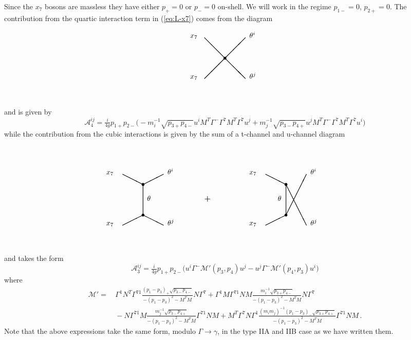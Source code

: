 \documentclass[a4paper,11pt]{article}
\begin{document}
Since the $x_7$ bosons are massless they have either $p_+=0$ or $p_-=0$ on-shell. We will work in the regime $p_{1-}=0$, $p_{2+}=0$. The contribution from the quartic interaction term in (\ref{eq:L-x7}) comes from the diagram
$$
\setlength{\unitlength}{1cm}
\begin{picture}(10,3.5)(0,0)
\thicklines
\put(3.3,3){$x_7$}
\put(3.3,1){$x_7$}
\put(4,3){\line(1,-1){2}}
\put(4,1){\line(1,1){2}}
\put(5,2){\circle*{0.15}}
\put(6.2,3){$\theta^i$}
\put(6.2,1){$\theta^j$}
\end{picture}
$$
and is given by
\begin{equation}
\mathcal A_4^{ij}=
\tfrac{i}{4g}p_{1+}p_{2-}
\big(
-m_i^{-1}\sqrt{p_{3+}p_{4-}}u^iM^T\Gamma^-\Gamma^7M^T\Gamma^7u^j
+m_j^{-1}\sqrt{p_{3-}p_{4+}}u^jM^T\Gamma^-\Gamma^7M^T\Gamma^7u^i
\big)
%
\end{equation}
while the contribution from the cubic interactions is given by the sum of a t-channel and u-channel diagram
$$
\setlength{\unitlength}{1cm}
\begin{picture}(17,5)(-1.5,0)
\thicklines
\put(1.2,3.5){$x_7$}
\put(1.2,1){$x_7$}
\put(2,3.5){\line(2,-1){1}}
\put(2,1){\line(2,1){1}}
\put(3,1.5){\line(0,1){1.5}}
\put(3,1.5){\circle*{0.15}}
\put(3,3){\circle*{0.15}}
\put(3,3){\line(2,1){1}}
\put(3,1.5){\line(2,-1){1}}
\put(4.2,3.5){$\theta^i$}
\put(4.2,1){$\theta^j$}
\put(3.2,2.2){$\theta$}
\put(6,2.2){\bf+}
\put(8.2,3.5){$x_7$}
\put(8.2,1){$x_7$}
\put(9,3.5){\line(2,-1){1}}
\put(9,1){\line(2,1){1}}
\put(10,1.5){\line(0,1){1.5}}
\put(10,1.5){\circle*{0.15}}
\put(10,3){\circle*{0.15}}
\put(10,3){\line(1,-2){1}}
\put(10,1.5){\line(1,2){1}}
\put(11.2,3.5){$\theta^i$}
\put(11.2,1){$\theta^j$}
\put(9.6,2.2){$\theta$}
\end{picture}
$$
and takes the form
\begin{equation}
\mathcal A_3^{ij}=
\tfrac{i}{4g}p_{1+}p_{2-}\big(u^i\Gamma^-\mathcal M'(p_3,p_4)u^j-u^j\Gamma^-\mathcal M'(p_4,p_3)u^i\big)
\end{equation}
where
\begin{align}
\mathcal M'
=\,&
\Gamma^1N^T\Gamma^{71}\frac{(p_1-p_3)_+\sqrt{p_{3-}p_{4-}}}{-(p_1-p_3)^2-M^TM}N\Gamma^7
+\Gamma^1M\Gamma^{71}NM\frac{m_i^{-1}\sqrt{p_{3+}p_{4-}}}{-(p_1-p_3)^2-M^TM}N\Gamma^7
\nonumber\\
&{}
-N\Gamma^{71}M\frac{m_j^{-1}\sqrt{p_{3-}p_{4+}}}{-(p_1-p_3)^2-M^TM}\Gamma^{71}NM
+M^T\Gamma^7N\Gamma^1\frac{(m_im_j)^{-1}(p_1-p_3)_-\sqrt{p_{3+}p_{4+}}}{-(p_1-p_3)^2-M^TM}\Gamma^{71}NM\,.
\end{align}
Note that the above expressions take the same form, modulo $\Gamma\rightarrow\gamma$, in the type IIA and IIB case as we have written them.
\end{document}
